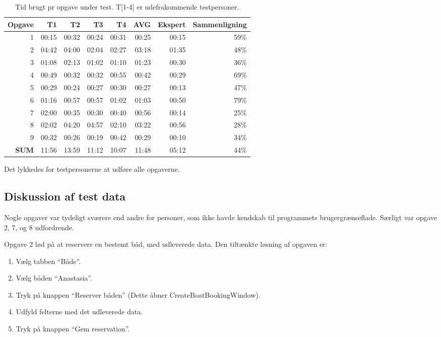 \begin{table}[htbp]
  \centering
  \caption{Tid brugt pr opgave under test. T[1-4] er udefrakommende testpersoner.}
    \begin{tabular}{r|rrrr|r|r|r}
    \textbf{Opgave} & T1     & T2     & T3     & T4     & \textbf{AVG} & \textbf{Ekspert} & \textbf{Sammenligning} \\ \hline
    1     & 00:15 & 00:32 & 00:24 & 00:31 & 00:25 & 00:15 & 59\% \\
    2     & 04:42 & 04:00 & 02:04 & 02:27 & 03:18 & 01:35 & 48\% \\
    3     & 01:08 & 02:13 & 01:02 & 01:10 & 01:23 & 00:30 & 36\% \\
    4     & 00:49 & 00:32 & 00:32 & 00:55 & 00:42 & 00:29 & 69\% \\
    5     & 00:29 & 00:24 & 00:27 & 00:30 & 00:27 & 00:13 & 47\% \\
    6     & 01:16 & 00:57 & 00:57 & 01:02 & 01:03 & 00:50 & 79\% \\
    7     & 02:00 & 00:35 & 00:30 & 00:40 & 00:56 & 00:14 & 25\% \\
    8     & 02:02 & 04:20 & 04:57 & 02:10 & 03:22 & 00:56 & 28\% \\
    9     & 00:32 & 00:26 & 00:19 & 00:42 & 00:29 & 00:10 & 34\% \\ \hline
    \textbf{SUM} & 11:56 & 13:59 & 11:12 & 10:07 & 11:48 & 05:12 & 44\% \\
    \end{tabular}%
  \label{tab:TestTimeTable}%
\end{table}%

Det lykkedes for testpersonerne at udføre alle opgaverne.

\subsection{Diskussion af test data}

Nogle opgaver var tydeligt sværere end andre for personer, som ikke havde kendskab til programmets brugergrænseflade. 
Særligt var opgave 2, 7, og 8 udfordrende.


Opgave 2 lød på at reservere en bestemt båd, med udleverede data.
Den tiltænkte løsning af opgaven er:
\begin{enumerate}
    \item Vælg tabben ``Både''.
    \item Vælg båden ``Anastasia''.
    \item Tryk på knappen ``Reserver båden'' (Dette åbner CreateBoatBookingWindow).
    \item Udfyld felterne med det udleverede data.
    \item Tryk på knappen ``Gem reservation''.
\end{enumerate}

